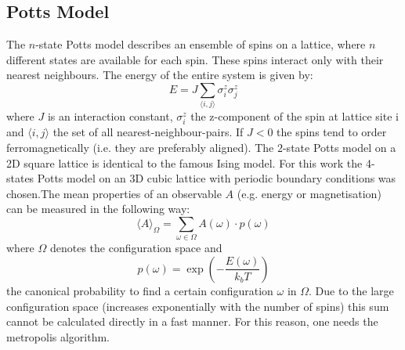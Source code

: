 \documentclass[letterpaper]{article}
\begin{document}
\subsection{Potts Model}
The $n$-state Potts model describes an ensemble of spins on a lattice, where $n$ different
states are available for each spin. These spins interact only with
their nearest neighbours. The energy of the entire system is given
by:
\[
E=J\sum_{\langle i,j \rangle}\sigma_{i}^{z}\sigma_{j}^{z}
\]
where $J$ is an interaction constant, $\sigma_{i}^{z}$ the z-component of the
spin at lattice site i and $\langle i,j \rangle$ the set of all nearest-neighbour-pairs.
If $J<0$ the spins tend to order ferromagnetically (i.e. they are preferably aligned). The $2$-state Potts model on a 2D square lattice is identical to the famous Ising
model. For this work the 4-states Potts model on an 3D cubic lattice
with periodic boundary conditions was chosen.\newline The mean properties of an observable $A$
(e.g. energy or magnetisation) can be measured in the following way:
\[
\langle A\rangle_\Omega=\sum_{\omega\in\Omega}A(\omega)\cdot p(\omega)
\]
where $\Omega$ denotes the configuration space and \[p(\omega)=\exp{\left(-\frac{E(\omega)}{k_{b}T}\right)}\]
the canonical probability to find a certain configuration $\omega$
in $\Omega$. 
Due to the large configuration space (increases exponentially with
the number of spins) this sum cannot be calculated directly in a fast
manner. For this reason, one needs the metropolis algorithm.
\end{document}

